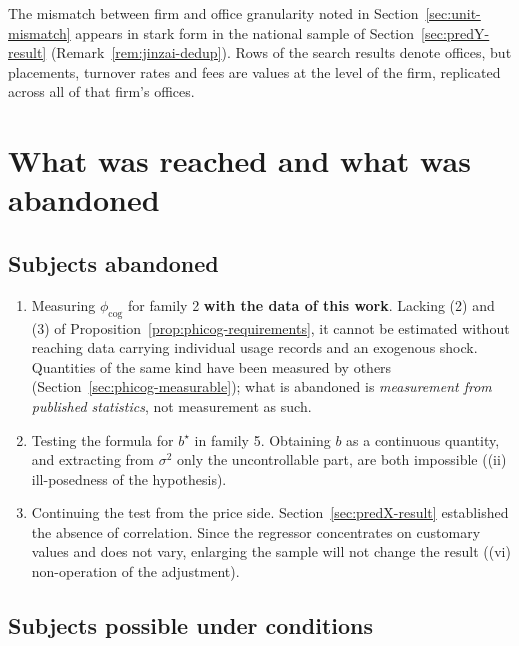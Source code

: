The mismatch between firm and office granularity noted in Section~\ref{sec:unit-mismatch} appears
in stark form in the national sample of Section~\ref{sec:predY-result}
(Remark~\ref{rem:jinzai-dedup}). Rows of the search results denote offices, but placements,
turnover rates and fees are values at the level of the firm, replicated across all of that firm's
offices.


\section{What was reached and what was abandoned}

\subsection{Subjects abandoned}

\begin{enumerate}[label=(\arabic*)]
\item Measuring $\phi_{\mathrm{cog}}$ for family 2 \textbf{with the data of this work}. Lacking
(2) and (3) of Proposition~\ref{prop:phicog-requirements}, it cannot be estimated without reaching
data carrying individual usage records and an exogenous shock. Quantities of the same kind have
been measured by others (Section~\ref{sec:phicog-measurable}); what is abandoned is
\emph{measurement from published statistics}, not measurement as such.

\item Testing the formula for $b^\star$ in family 5. Obtaining $b$ as a continuous quantity, and
extracting from $\sigma^2$ only the uncontrollable part, are both impossible ((ii) ill-posedness
of the hypothesis).

\item Continuing the test from the price side. Section~\ref{sec:predX-result} established the
absence of correlation. Since the regressor concentrates on customary values and does not vary,
enlarging the sample will not change the result ((vi) non-operation of the adjustment).

\end{enumerate}

\subsection{Subjects possible under conditions}

